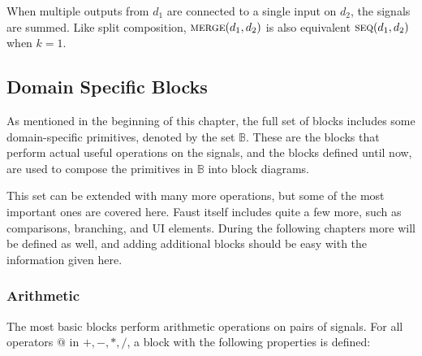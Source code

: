 When multiple outputs from $d_1$ are connected to a single input on $d_2$,
the signals are summed. Like split composition, $\Merge(d_1, d_2)$ is also equivalent
$\Sequential(d_1, d_2)$ when $k = 1$.

\begin{minipage}{0.5\linewidth}
  \begin{prooftree}
  \end{prooftree}
  \begin{prooftree}
  \end{prooftree}
\end{minipage}
\begin{minipage}{0.5\linewidth}
  \begin{figure}[H]
    \centering
    \label{fig:block_merge}
    
  \end{figure}
\end{minipage}

\subsection{Domain Specific Blocks}

As mentioned in the beginning of this chapter, the full set of blocks includes some domain-specific
primitives, denoted by the set $\mathbb B$. These are the blocks that perform actual useful
operations on the signals, and the blocks defined until now, are used to compose the primitives in
$\mathbb B$ into block diagrams.

This set can be extended with many more operations, but some of the most important ones are covered here.
Faust itself includes quite a few more\autocite{orlarey2004}, such as comparisons, branching, and UI
elements. During the following chapters more will be defined as well, and adding additional blocks should be
easy with the information given here.

\subsubsection{Arithmetic}
\label{sec:block_arithmetic}
The most basic blocks perform arithmetic operations on pairs of signals. For all operators
$@$ in ${+, -, *, /}$, a block with the following properties is defined:

